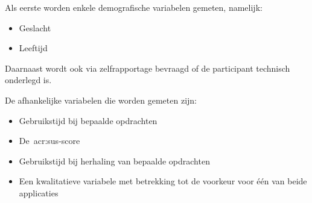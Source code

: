 Als eerste worden enkele demografische variabelen gemeten, namelijk:
\begin{itemize}
    \item Geslacht
    \item Leeftijd
\end{itemize}
Daarnaast wordt ook via zelfrapportage bevraagd of de participant technisch onderlegd is.

De afhankelijke variabelen die worden gemeten zijn:
\begin{itemize}
    \item Gebruikstijd bij bepaalde opdrachten
    \item De~\acrshort{acr:sus}-score
    \item Gebruikstijd bij herhaling van bepaalde opdrachten
    \item Een kwalitatieve variabele met betrekking tot de voorkeur voor één van beide applicaties
\end{itemize}

